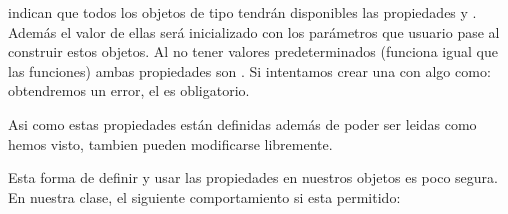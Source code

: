 \documentclass[a4paper,12pt,spanish]{sphinxmanual}
\begin{document}
%
\begin{sphinxVerbatim}[commandchars=\\\{\}]
 
       
          
          
\end{sphinxVerbatim}
\sphinxresetverbatimhllines

\sphinxAtStartPar
indican que todos los objetos de tipo  tendrán disponibles las propiedades
 y . Además el valor de ellas será inicializado con los parámetros
que usuario pase al construir estos objetos.
Al no tener valores predeterminados (funciona igual que las funciones) ambas propiedades
son . Si intentamos crear una  con algo como:
 obtendremos un error, el  es
obligatorio.

\sphinxAtStartPar
Asi como estas propiedades están definidas además de poder ser leidas como hemos visto,
tambien pueden modificarse libremente.

\begin{sphinxVerbatim}[commandchars=\\\{\}]
   
  
\end{sphinxVerbatim}

\sphinxAtStartPar
Esta forma de definir y usar las propiedades en nuestros objetos es poco segura.
En nuestra clase, el siguiente comportamiento si esta permitido:

%
\begin{sphinxVerbatim}[commandchars=\\\{\}]
   
    
\end{sphinxVerbatim}
\sphinxresetverbatimhllines
\end{document}

